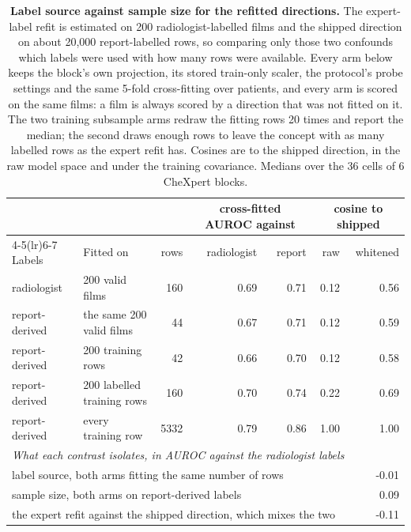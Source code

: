 \begin{table}[h]
\centering
\scriptsize
\setlength{\tabcolsep}{4pt}
\caption{\textbf{Label source against sample size for the refitted directions.} The expert-label refit is estimated on 200 radiologist-labelled films and the shipped direction on about 20{,}000 report-labelled rows, so comparing only those two confounds which labels were used with how many rows were available. Every arm below keeps the block's own projection, its stored train-only scaler, the protocol's probe settings and the same 5-fold cross-fitting over patients, and every arm is scored on the same films: a film is always scored by a direction that was not fitted on it. The two training subsample arms redraw the fitting rows 20 times and report the median; the second draws enough rows to leave the concept with as many labelled rows as the expert refit has. Cosines are to the shipped direction, in the raw model space and under the training covariance. Medians over the 36 cells of 6 CheXpert blocks.}
\label{tab:cf-validfit-arms}
\begin{tabular}{llrrrrr}
\toprule
 & & & \multicolumn{2}{c}{cross-fitted AUROC against} & \multicolumn{2}{c}{cosine to shipped} \\
\cmidrule(lr){4-5}\cmidrule(lr){6-7}
Labels & Fitted on & rows & radiologist & report & raw & whitened \\
\midrule
radiologist & 200 valid films & 160 & 0.69 & 0.71 & 0.12 & 0.56 \\
report-derived & the same 200 valid films & 44 & 0.67 & 0.71 & 0.12 & 0.59 \\
report-derived & 200 training rows & 42 & 0.66 & 0.70 & 0.12 & 0.58 \\
report-derived & 200 labelled training rows & 160 & 0.70 & 0.74 & 0.22 & 0.69 \\
report-derived & every training row & 5332 & 0.79 & 0.86 & 1.00 & 1.00 \\
\midrule
\multicolumn{7}{l}{\textit{What each contrast isolates, in AUROC against the radiologist labels}} \\
\midrule
\multicolumn{6}{l}{label source, both arms fitting the same number of rows} & -0.01 \\
\multicolumn{6}{l}{sample size, both arms on report-derived labels} & 0.09 \\
\multicolumn{6}{l}{the expert refit against the shipped direction, which mixes the two} & -0.11 \\
\bottomrule
\end{tabular}
\end{table}
